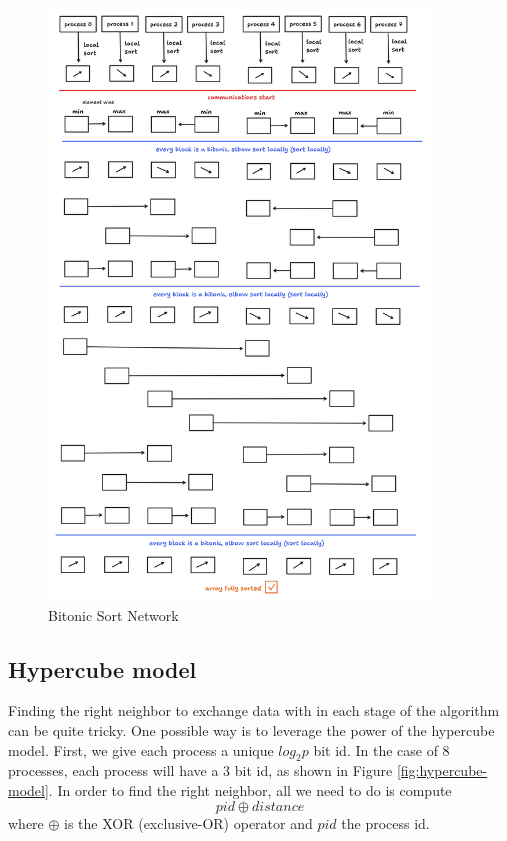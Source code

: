 \documentclass{article}
\begin{document}
\begin{figure}[H]
    \centering
    \includegraphics[width=0.9\textwidth]{bitonic-sort-network.png}
    \caption{Bitonic Sort Network}
    \label{fig:bitonic-sort-network}
\end{figure}


\subsection{Hypercube model}

Finding the right neighbor to exchange data with in each stage of the algorithm can be quite tricky. One possible way
is to leverage the power of the hypercube model. First, we give each process a unique $log_2{p}$ bit id. In the case
of 8 processes, each process will have a 3 bit id, as shown in Figure \ref{fig:hypercube-model}. In order to find the right neighbor, all we
need to do is compute $$pid \oplus distance$$ where $\oplus$ is the XOR (exclusive-OR) operator and $pid$ the process id.
\end{document}
